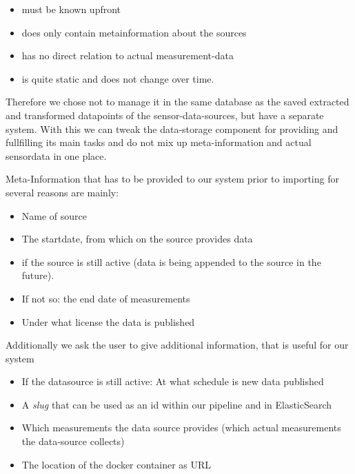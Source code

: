 \begin{itemize}
	\item
	must be known upfront
	\item
	does only contain metainformation about the sources
	\item
	has no direct relation to actual measurement-data
	\item
	is quite static and does not change over time.
\end{itemize}

Therefore we chose not to manage it in the same database as the saved
extracted and transformed datapoints of the sensor-data-sources, but
have a separate system. With this we can tweak the data-storage
component for providing and fullfilling its main tasks and do not mix up
meta-information and actual sensordata in one place.

Meta-Information that has to be provided to our system prior to
importing for several reasons are mainly:

\begin{itemize}
	\item
	Name of source
	\item
	The startdate, from which on the source provides data
	\item
	if the source is still active (data is being appended to the source in
	the future).
	\item
	If not so: the end date of measurements
	\item
	Under what license the data is published
\end{itemize}

Additionally we ask the user to give additional information, that is
useful for our system

\begin{itemize}
	\item
	If the datasource is still active: At what schedule is new data
	published
	\item
	A \emph{slug} that can be used as an id within our pipeline and in
	ElasticSearch
	\item
	Which measurements the data source provides (which actual measurements
	the data-source collects)
	\item
	The location of the docker container as URL
\end{itemize}


